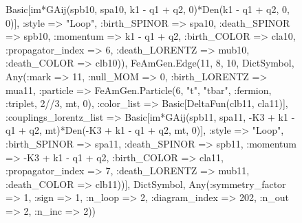 \documentclass{revtex4}
\begin{document}
\begin{figure}[!htb]
\begin{center}
{Basic[im*GAij(spb10, spa10, k1 - q1 + q2, 0)*Den(k1 - q1 + q2, 0, 0)], :style => "Loop", :birth_SPINOR => spa10, :death_SPINOR => spb10, :momentum => k1 - q1 + q2, :birth_COLOR => cla10, :propagator_index => 6, :death_LORENTZ => mub10, :death_COLOR => clb10)), FeAmGen.Edge(11, 8, 10, Dict{Symbol, Any}(:mark => 11, :null_MOM => 0, :birth_LORENTZ => mua11, :particle => FeAmGen.Particle(6, "t", "tbar", :fermion, :triplet, 2//3, mt, 0), :color_list => Basic[DeltaFun(clb11, cla11)], :couplings_lorentz_list => Basic[im*GAij(spb11, spa11, -K3 + k1 - q1 + q2, mt)*Den(-K3 + k1 - q1 + q2, mt, 0)], :style => "Loop", :birth_SPINOR => spa11, :death_SPINOR => spb11, :momentum => -K3 + k1 - q1 + q2, :birth_COLOR => cla11, :propagator_index => 7, :death_LORENTZ => mub11, :death_COLOR => clb11))], Dict{Symbol, Any}(:symmetry_factor => 1, :sign => 1, :n_loop => 2, :diagram_index => 202, :n_out => 2, :n_inc => 2)) 
}
\end{center}
\end{figure}
\end{document}
